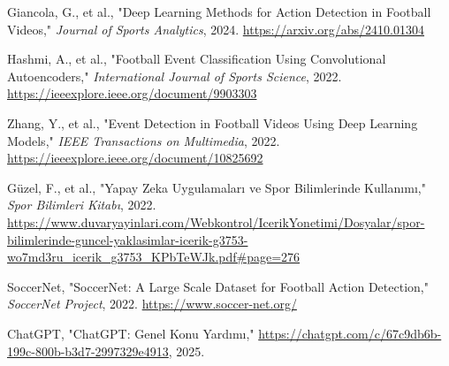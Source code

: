 \documentclass[a4paper,12pt]{article}
\begin{document}
\renewcommand{\refname}{Kaynakça} 

	\begin{thebibliography}{6}
   
     Giancola, G., et al., "Deep Learning Methods for Action Detection in Football Videos," \textit{Journal of Sports Analytics}, 2024. \href{https://arxiv.org/abs/2410.01304}{https://arxiv.org/abs/2410.01304}
   
     Hashmi, A., et al., "Football Event Classification Using Convolutional Autoencoders," \textit{International Journal of Sports Science}, 2022. \href{https://ieeexplore.ieee.org/document/9903303}{https://ieeexplore.ieee.org/document/9903303}
    
     Zhang, Y., et al., "Event Detection in Football Videos Using Deep Learning Models," \textit{IEEE Transactions on Multimedia}, 2022. \href{https://ieeexplore.ieee.org/document/10825692}{https://ieeexplore.ieee.org/document/10825692}
   
     Güzel, F., et al., "Yapay Zeka Uygulamaları ve Spor Bilimlerinde Kullanımı," \textit{Spor Bilimleri Kitabı}, 2022. \href{https://www.duvaryayinlari.com/Webkontrol/IcerikYonetimi/Dosyalar/spor-bilimlerinde-guncel-yaklasimlar-icerik-g3753-wo7md3ru_icerik_g3753_KPbTeWJk.pdf#page=276}{https://www.duvaryayinlari.com/Webkontrol/IcerikYonetimi/Dosyalar/spor-bilimlerinde-guncel-yaklasimlar-icerik-g3753-wo7md3ru_icerik_g3753_KPbTeWJk.pdf#page=276}
    
     SoccerNet, "SoccerNet: A Large Scale Dataset for Football Action Detection," \textit{SoccerNet Project}, 2022. \href{https://www.soccer-net.org/}{https://www.soccer-net.org/}
   
     ChatGPT, "ChatGPT: Genel Konu Yardımı," \href{https://chatgpt.com/c/67c9db6b-199c-800b-b3d7-2997329e4913}{https://chatgpt.com/c/67c9db6b-199c-800b-b3d7-2997329e4913}, 2025.
	
    \end{thebibliography}
\end{document}
